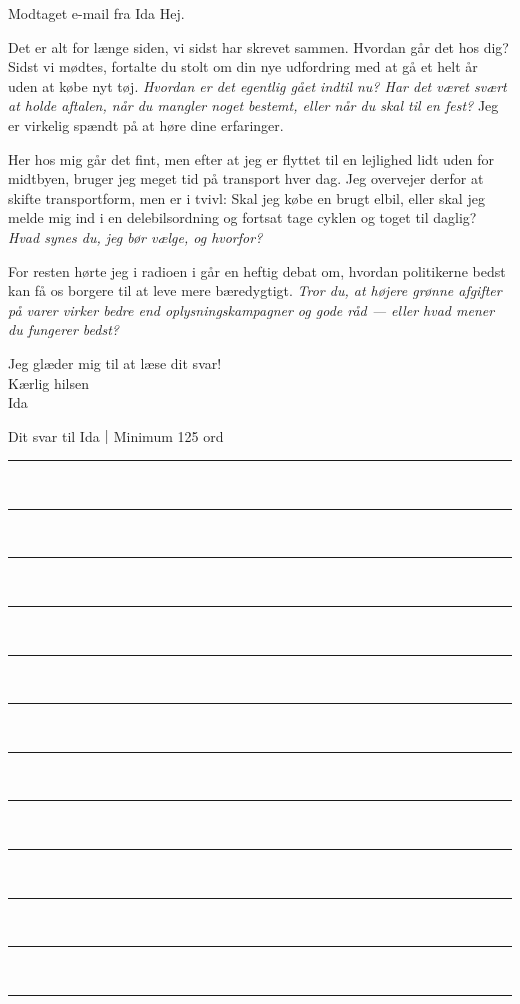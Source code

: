 \begin{emailbox}{Modtaget e-mail fra Ida}
Hej.

\vspace{0.3em}
Det er alt for længe siden, vi sidst har skrevet sammen. Hvordan går det hos dig? Sidst vi mødtes, fortalte du stolt om din nye udfordring med at gå et helt år uden at købe nyt tøj. \textit{Hvordan er det egentlig gået indtil nu? Har det været svært at holde aftalen, når du mangler noget bestemt, eller når du skal til en fest?} Jeg er virkelig spændt på at høre dine erfaringer.

\vspace{0.3em}
Her hos mig går det fint, men efter at jeg er flyttet til en lejlighed lidt uden for midtbyen, bruger jeg meget tid på transport hver dag. Jeg overvejer derfor at skifte transportform, men er i tvivl: Skal jeg købe en brugt elbil, eller skal jeg melde mig ind i en delebilsordning og fortsat tage cyklen og toget til daglig? \textit{Hvad synes du, jeg bør vælge, og hvorfor?}

\vspace{0.3em}
For resten hørte jeg i radioen i går en heftig debat om, hvordan politikerne bedst kan få os borgere til at leve mere bæredygtigt. \textit{Tror du, at højere grønne afgifter på varer virker bedre end oplysningskampagner og gode råd --- eller hvad mener du fungerer bedst?}

\vspace{0.3em}
Jeg glæder mig til at læse dit svar!\\
Kærlig hilsen\\
Ida
\end{emailbox}

\begin{emailbox}{Dit svar til Ida｜Minimum 125 ord}
\vspace{0.25em}
\rule{\linewidth}{0.4pt}\\[0.55em]
\rule{\linewidth}{0.4pt}\\[0.55em]
\rule{\linewidth}{0.4pt}\\[0.55em]
\rule{\linewidth}{0.4pt}\\[0.55em]
\rule{\linewidth}{0.4pt}\\[0.55em]
\rule{\linewidth}{0.4pt}\\[0.55em]
\rule{\linewidth}{0.4pt}\\[0.55em]
\rule{\linewidth}{0.4pt}\\[0.55em]
\rule{\linewidth}{0.4pt}\\[0.55em]
\rule{\linewidth}{0.4pt}\\[0.55em]
\rule{\linewidth}{0.4pt}\\[0.55em]
\rule{\linewidth}{0.4pt}
\end{emailbox}

